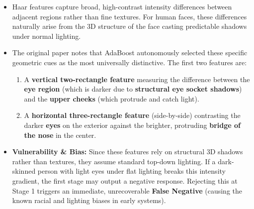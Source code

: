 {
\begin{itemize}
    \item Haar features capture broad, high-contrast intensity differences between adjacent regions rather than fine textures. For human faces, these differences naturally arise from the 3D structure of the face casting predictable shadows under normal lighting.
    \item The original paper notes that AdaBoost autonomously selected these specific geometric cues as the most universally distinctive. The first two features are:
    \begin{enumerate}
        \item A \textbf{vertical two-rectangle feature} measuring the difference between the \textbf{eye region} (which is darker due to \textbf{structural eye socket shadows}) and the \textbf{upper cheeks} (which protrude and catch light).
        \item A \textbf{horizontal three-rectangle feature} (side-by-side) contrasting the darker \textbf{eyes} on the exterior against the brighter, protruding \textbf{bridge of the nose} in the center.
    \end{enumerate}
    \item \textbf{Vulnerability \& Bias:} Since these features rely on structural 3D shadows rather than textures, they assume standard top-down lighting. If a dark-skinned person with light eyes under flat lighting breaks this intensity gradient, the first stage may output a negative response. Rejecting this at Stage 1 triggers an immediate, unrecoverable \textbf{False Negative} (causing the known racial and lighting biases in early systems).
\end{itemize}}
